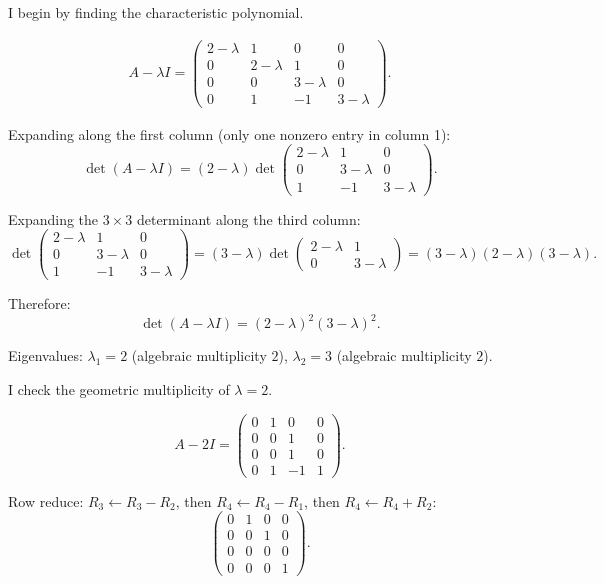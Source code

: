 \documentclass{article}
\begin{document}
\begin{mdframed}[linewidth=1pt]
\textnormal{I begin by finding the characteristic polynomial.}

\begin{align*}
A - \lambda I = \begin{pmatrix} 2-\lambda & 1 & 0 & 0 \\ 0 & 2-\lambda & 1 & 0 \\ 0 & 0 & 3-\lambda & 0 \\ 0 & 1 & -1 & 3-\lambda \end{pmatrix}.
\end{align*}

Expanding along the first column (only one nonzero entry in column 1):
\[
\det(A - \lambda I) = (2-\lambda) \det\begin{pmatrix} 2-\lambda & 1 & 0 \\ 0 & 3-\lambda & 0 \\ 1 & -1 & 3-\lambda \end{pmatrix}.
\]

Expanding the $3 \times 3$ determinant along the third column:
\[
\det\begin{pmatrix} 2-\lambda & 1 & 0 \\ 0 & 3-\lambda & 0 \\ 1 & -1 & 3-\lambda \end{pmatrix} = (3-\lambda)\det\begin{pmatrix} 2-\lambda & 1 \\ 0 & 3-\lambda \end{pmatrix} = (3-\lambda)(2-\lambda)(3-\lambda).
\]

Therefore:
\[
\det(A - \lambda I) = (2-\lambda)^2(3-\lambda)^2.
\]

Eigenvalues: $\lambda_1 = 2$ (algebraic multiplicity $2$), $\lambda_2 = 3$ (algebraic multiplicity $2$).

\medskip
\textnormal{I check the geometric multiplicity of $\lambda = 2$.}

\[
A - 2I = \begin{pmatrix} 0 & 1 & 0 & 0 \\ 0 & 0 & 1 & 0 \\ 0 & 0 & 1 & 0 \\ 0 & 1 & -1 & 1 \end{pmatrix}.
\]

Row reduce: $R_3 \leftarrow R_3 - R_2$, then $R_4 \leftarrow R_4 - R_1$, then $R_4 \leftarrow R_4 + R_2$:
\[
\begin{pmatrix} 0 & 1 & 0 & 0 \\ 0 & 0 & 1 & 0 \\ 0 & 0 & 0 & 0 \\ 0 & 0 & 0 & 1 \end{pmatrix}.
\]


\end{mdframed}
\end{document}

